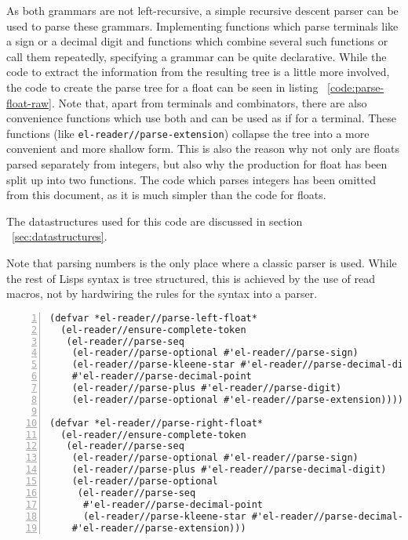 \documentclass[a4paper,10pt,twoside]{report}
\newcommand{\fun}[1]{\texttt{#1}}
\begin{document}
As both grammars are not left-recursive, a simple recursive descent parser can
be used to parse these grammars.  Implementing functions which parse terminals
like a sign or a decimal digit and functions which combine several such
functions or call them repeatedly, specifying a grammar can be quite
declarative.  While the code to extract the information from the resulting tree
is a little more involved, the code to create the parse tree for a float can be
seen in listing ~\ref{code:parse-float-raw}.  Note that, apart from terminals and
combinators, there are also convenience functions which use both and can be used
as if for a terminal.  These functions (like \fun{el-reader//parse-extension})
collapse the tree into a more convenient and more shallow form.  This is also
the reason why not only are floats parsed separately from integers, but also why
the production for float has been split up into two functions.  The code which
parses integers has been omitted from this document, as it is much simpler than
the code for floats.

The datastructures used for this code are discussed in section
~\ref{sec:datastructures}.

Note that parsing numbers is the only place where a classic parser is used.
While the rest of Lisps syntax is tree structured, this is achieved by the use
of read macros, not by hardwiring the rules for the syntax into a parser.

\begin{lstlisting}[style=lispcode,label={code:parse-float-raw},caption={Create a
  function which parses a float into a tree.},numbers=left]
(defvar *el-reader//parse-left-float*
  (el-reader//ensure-complete-token
   (el-reader//parse-seq
    (el-reader//parse-optional #'el-reader//parse-sign)
    (el-reader//parse-kleene-star #'el-reader//parse-decimal-digit)
    #'el-reader//parse-decimal-point
    (el-reader//parse-plus #'el-reader//parse-digit)
    (el-reader//parse-optional #'el-reader//parse-extension))))

(defvar *el-reader//parse-right-float*
  (el-reader//ensure-complete-token
   (el-reader//parse-seq
    (el-reader//parse-optional #'el-reader//parse-sign)
    (el-reader//parse-plus #'el-reader//parse-decimal-digit)
    (el-reader//parse-optional
     (el-reader//parse-seq
      #'el-reader//parse-decimal-point
      (el-reader//parse-kleene-star #'el-reader//parse-decimal-digit)))
    #'el-reader//parse-extension)))
\end{lstlisting}
\end{document}
